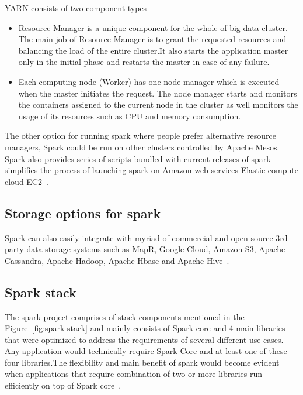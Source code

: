 YARN consists of two component types

\begin{itemize}

\item Resource Manager is a unique component for the whole of big data cluster. The 
main job of Resource Manager is to grant the requested resources and balancing 
the load of the entire cluster.It also starts the application master only in 
the initial phase and restarts the master in case of any failure.

\item Each computing node (Worker) has one node manager  which is executed when the 
master initiates the request. The node manager starts and monitors the 
containers assigned to the current node in the cluster as well monitors the 
usage of its resources such as CPU and memory consumption.

\end{itemize}

The other option for running spark where people prefer alternative resource 
managers, Spark could be run on other clusters controlled by Apache Mesos.
Spark also provides series of scripts bundled with current releases of spark 
simplifies the process of launching spark on Amazon web services Elastic 
compute cloud EC2~\cite{hid-sp18-410-spark-architecture}.

\subsection{Storage options for spark}

Spark can also easily integrate with myriad of commercial and open source 3rd 
party data storage systems such as MapR, Google Cloud, Amazon S3, Apache 
Cassandra, Apache Hadoop, Apache Hbase and Apache Hive~\cite{hid-sp18-410-spark-architecture}.


\subsection{Spark stack}


The spark project comprises of stack components mentioned in the 
Figure~\ref{fig:spark-stack} and mainly consists of Spark core and 
4 main libraries that were optimized to address the requirements 
of several different use cases.
Any application would technically require Spark Core and at least one of these 
four libraries.The flexibility and main benefit of spark would become evident 
when applications that require combination of two or more libraries run 
efficiently on top of Spark core~\cite{hid-sp18-410-spark-architecture}.



